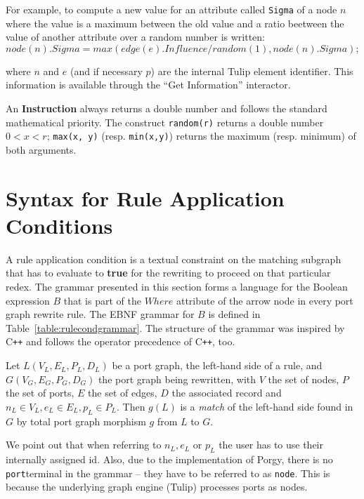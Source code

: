 \documentclass[a4paper,10pt,runningheads]{llncs}
\newcommand{\PORGY}{{\sc Porgy}\xspace}
\newcommand{\TULIP}{{\sc Tulip}\xspace}
\newcommand{\Id}{{\sf id}}
\newcommand{\Node}{{\tt node}}
\newcommand{\Port}{{\tt port}}
\newcommand{\CC}{{C\texttt{++}}\xspace}
\begin{document}
For example, to compute a new value for an attribute called {\tt Sigma} of a node $n$ where the value is a maximum between the old value and a ratio beetween the value of another attribute over a random number is written: 
\[ 
node(n).Sigma = max(edge(e).Influence/random(1),node(n).Sigma);
\]

where $n$ and $e$ (and if necessary $p$) are the internal \TULIP element identifier. This 
information is available through the ``Get Information'' interactor.

An {\bf Instruction} always returns a double number and  follows the standard 
mathematical priority. 
The construct {\tt random(r)} returns a double number $0 < x < r$; {\tt max(x, y)} (resp. 
{\tt min(x,y)}) returns the maximum (resp. minimum) of both arguments.


\section*{Syntax for Rule Application Conditions}\label{rulecond}


A rule application condition is a textual constraint on the matching subgraph that has to evaluate to \textbf{true}
for the rewriting to proceed on that particular redex. The grammar presented in this section
forms a language for the Boolean expression $B$ that is part of the $Where$ attribute of the arrow node
in every port graph rewrite rule.
The EBNF grammar for $B$ is defined in Table~\ref{table:rulecondgrammar}.
The structure of the grammar was inspired by \CC and follows the operator precedence of \CC, too.

Let $L(V_L, E_L, P_L, D_L)$ be a port graph, the left-hand side of a rule, 
and $G(V_G, E_G, P_G, D_G)$ the port graph being rewritten,
with $V$ the set of nodes, $P$ the set of ports, $E$ the set of edges, $D$ the associated record and 
$n_L \in V_L, e_L \in E_L, p_L \in P_L$.
Then $g(L)$ is a \emph{match} of the left-hand side found in $G$ by total port graph morphism $g$ from $L$ to $G$.

We point out that when referring to $n_L, e_L$ or $p_L$ the user has to use their internally assigned \Id. 
Also, due to the implementation of \PORGY, there is no \Port terminal in the grammar -- 
they have to be referred to as \Node. 
This is because the underlying graph engine (\TULIP) processes ports as nodes.
\end{document}
